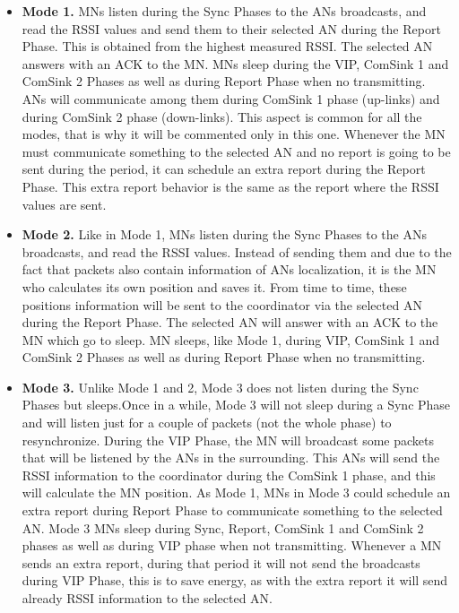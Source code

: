 \begin{itemize}
 \item \textbf{Mode 1.} \acp{MN} listen during the Sync Phases to the \acp{AN} broadcasts, and read the \ac{RSSI} values and send them
to their selected \ac{AN} during the Report Phase. This is obtained from the highest measured \ac{RSSI}. The selected \ac{AN} answers with an \ac{ACK} 
to the \ac{MN}. \acp{MN} sleep during the \ac{VIP}, ComSink 1 and ComSink 2 Phases as well as during Report Phase when no transmitting. 
\acp{AN} will communicate among them during ComSink 1 phase (up-links) and during ComSink 2 phase (down-links). This aspect is common for all the 
modes, that is why it will be commented only in this one. Whenever the \ac{MN} must communicate something to the selected \ac{AN} and no report 
is going to be sent during the period, it can schedule an extra report during the Report Phase. This extra report behavior is the same as the report 
where the \ac{RSSI} values are sent.
 
 \item \textbf{Mode 2.} Like in Mode 1, \acp{MN} listen during the Sync Phases to the \acp{AN} broadcasts, and read the \ac{RSSI} values. Instead
of sending them and due to the fact that packets also contain information of \acp{AN} localization, it is the \ac{MN} who calculates its own position 
and saves it. From time to time, these positions information will be sent to the coordinator via the selected \ac{AN} during the Report Phase. The 
selected \ac{AN} will answer with an \ac{ACK} to the \ac{MN} which go to sleep. \ac{MN} sleeps, like Mode 1, during \ac{VIP}, ComSink 1 and ComSink 2 
Phases as well as during Report Phase when no transmitting.

 \item \textbf{Mode 3.} Unlike Mode 1 and 2, Mode 3 does not listen during the Sync Phases but sleeps.Once in a while, Mode 3 will not sleep during a 
Sync Phase and will listen just for a couple of packets (not the whole phase) to resynchronize. During the \ac{VIP} Phase, the \ac{MN} will broadcast
some packets that will be listened by the \acp{AN} in the surrounding. This \acp{AN} will send the \ac{RSSI} information to the coordinator during the 
ComSink 1 phase, and this will calculate the \ac{MN} position. As Mode 1, \acp{MN} in Mode 3 could schedule an extra report during Report Phase to
communicate something to the selected \ac{AN}. Mode 3 \acp{MN} sleep during Sync, Report, ComSink 1 and ComSink 2 phases as well as during \ac{VIP} phase
when not transmitting. Whenever a \ac{MN} sends an extra report, during that period it will not send the broadcasts during \ac{VIP} Phase, this is to 
save energy, as with the extra report it will send already \ac{RSSI} information to the selected \ac{AN}.


\end{itemize}
